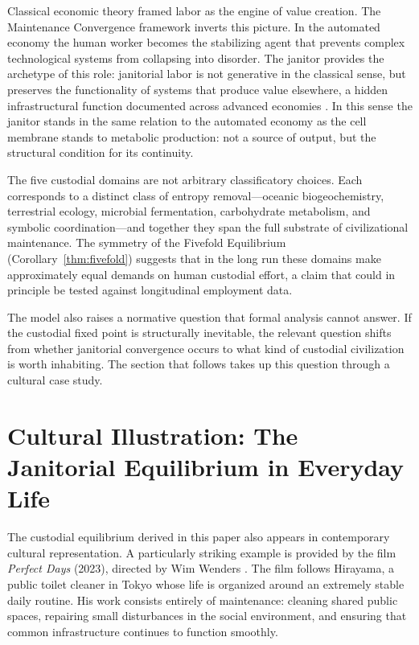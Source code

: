 \documentclass[12pt,a4paper]{article}
\theoremstyle{plain}
\theoremstyle{definition}
\theoremstyle{remark}
\begin{document}
Classical economic theory framed labor as the engine of value creation.  The
Maintenance Convergence framework inverts this picture.  In the automated
economy the human worker becomes the stabilizing agent that prevents complex
technological systems from collapsing into disorder.  The janitor provides the
archetype of this role: janitorial labor is not generative in the classical
sense, but preserves the functionality of systems that produce value elsewhere,
a hidden infrastructural function documented across advanced economies
\cite{star1999}.
In this sense the janitor stands in the same relation to the automated economy
as the cell membrane stands to metabolic production: not a source of output,
but the structural condition for its continuity.

The five custodial domains are not arbitrary classificatory choices.  Each
corresponds to a distinct class of entropy removal---oceanic biogeochemistry,
terrestrial ecology, microbial fermentation, carbohydrate metabolism, and
symbolic coordination---and together they span the full substrate of
civilizational maintenance.  The symmetry of the Fivefold Equilibrium
(Corollary~\ref{thm:fivefold}) suggests that in the long run these domains
make approximately equal demands on human custodial effort, a claim that
could in principle be tested against longitudinal employment data.

The model also raises a normative question that formal analysis cannot
answer.  If the custodial fixed point is structurally inevitable, the
relevant question shifts from whether janitorial convergence occurs to what
kind of custodial civilization is worth inhabiting.  The section that follows
takes up this question through a cultural case study.

\section{Cultural Illustration: The Janitorial Equilibrium in Everyday Life}
\label{sec:cultural}

The custodial equilibrium derived in this paper also appears in contemporary
cultural representation.  A particularly striking example is provided by the
film \emph{Perfect Days} (2023), directed by Wim Wenders \cite{wenders2023}.  The film follows
Hirayama, a public toilet cleaner in Tokyo whose life is organized around an
extremely stable daily routine.  His work consists entirely of maintenance:
cleaning shared public spaces, repairing small disturbances in the social
environment, and ensuring that common infrastructure continues to function
smoothly.
\end{document}
